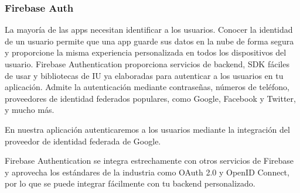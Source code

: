\subsubsection{Firebase Auth}

La mayoría de las apps necesitan identificar a los usuarios. Conocer la identidad de un usuario permite que una app guarde sus datos en la nube de forma segura y proporcione la misma experiencia personalizada en todos los dispositivos del usuario.
Firebase Authentication proporciona servicios de backend, SDK fáciles de usar y bibliotecas de IU ya elaboradas para autenticar a los usuarios en tu aplicación. Admite la autenticación mediante contraseñas, números de teléfono, proveedores de identidad federados populares, como Google, Facebook y Twitter, y mucho más.

En nuestra aplicación autenticaremos a los usuarios mediante la integración del proveedor de identidad federada de Google.

Firebase Authentication se integra estrechamente con otros servicios de Firebase y aprovecha los estándares de la industria como OAuth 2.0 y OpenID Connect, por lo que se puede integrar fácilmente con tu backend personalizado.
